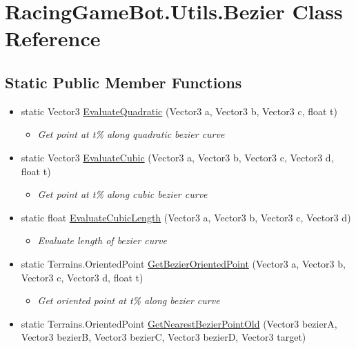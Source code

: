 \hypertarget{classRacingGameBot_1_1Utils_1_1Bezier}{}
\section{RacingGameBot.Utils.Bezier Class Reference}
\label{classRacingGameBot_1_1Utils_1_1Bezier}

\subsection*{Static Public Member Functions}
\begin{itemize}
\item[] static Vector3 \mbox{\hyperlink{classRacingGameBot_1_1Utils_1_1Bezier_a3e92c1a09faa360bd0aeb4f7915788f4}{EvaluateQuadratic}} (Vector3 a, Vector3 b, Vector3 c, float t)
\begin{itemize}
\small
\item[] \em Get point at t\% along quadratic bezier curve \end{itemize}
\item[] static Vector3 \mbox{\hyperlink{classRacingGameBot_1_1Utils_1_1Bezier_ab4601798803b08a1d8d0a82d34f3c2e8}{EvaluateCubic}} (Vector3 a, Vector3 b, Vector3 c, Vector3 d, float t)
\begin{itemize}
\small
\item[] \em Get point at t\% along cubic bezier curve \end{itemize}\item[] static float \mbox{\hyperlink{classRacingGameBot_1_1Utils_1_1Bezier_a3071f815b287a70f4089d70d1b1d19ac}{EvaluateCubicLength}} (Vector3 a, Vector3 b, Vector3 c, Vector3 d)
\begin{itemize}
\small
\item[] \em Evaluate length of bezier curve \end{itemize}
\item[] static Terrains.OrientedPoint \mbox{\hyperlink{classRacingGameBot_1_1Utils_1_1Bezier_ad32b47fbd977497a23e38688c92b704e}{GetBezierOrientedPoint}} (Vector3 a, Vector3 b, Vector3 c, Vector3 d, float t)
\begin{itemize}
\small
\item[] \em Get oriented point at t\% along bezier curve \end{itemize}\item[] static Terrains.OrientedPoint \mbox{\hyperlink{classRacingGameBot_1_1Utils_1_1Bezier_ab5f612106cf61ddcd238b8dddf976156}{GetNearestBezierPointOld}} (Vector3 bezierA, Vector3 bezierB, Vector3 bezierC, Vector3 bezierD, Vector3 target)

\end{itemize}
